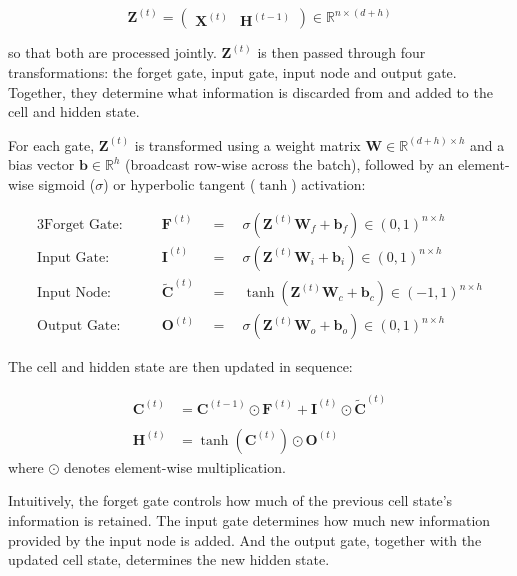 \documentclass[
]{krantz}
\begin{document}
\[
\mathbf{Z}^{(t)} = 
\begin{pmatrix}
\mathbf{X}^{(t)} & \mathbf{H}^{(t-1)}
\end{pmatrix} \in \mathbb{R}^{n \times (d + h)}
\]

so that both are processed jointly. \(\mathbf{Z}^{(t)}\) is then passed through four transformations: the forget gate, input gate, input node and output gate. Together, they determine what information is discarded from and added to the cell and hidden state.

For each gate, \(\mathbf{Z}^{(t)}\) is transformed using a weight matrix \(\mathbf{W} \in \mathbb{R}^{(d + h) \times h}\) and a bias vector \(\mathbf{b} \in \mathbb{R}^h\) (broadcast row-wise across the batch), followed by an element-wise sigmoid (\(\sigma\)) or hyperbolic tangent (\(\tanh\)) activation:

\begin{alignat*}{3}
\text{Forget Gate:} \qquad & \mathbf{F}^{(t)} & \enspace = \enspace &
  \sigma \left(\mathbf{Z}^{(t)} \mathbf{W}_f + \mathbf{b}_f\right) \in (0, 1)^{n \times h} \\
\text{Input Gate:} \qquad & \mathbf{I}^{(t)}& \enspace = \enspace &
  \sigma \left(\mathbf{Z}^{(t)} \mathbf{W}_i + \mathbf{b}_i\right) \in (0, 1)^{n \times h} \\
\text{Input Node:} \qquad & \tilde{\mathbf{C}}^{(t)} & \enspace = \enspace &
  \tanh \left(\mathbf{Z}^{(t)} \mathbf{W}_c + \mathbf{b}_c\right) \in (-1, 1)^{n \times h} \\
\text{Output Gate:} \qquad & \mathbf{O}^{(t)} & \enspace = \enspace & 
  \sigma \left(\mathbf{Z}^{(t)} \mathbf{W}_o + \mathbf{b}_o\right) \in (0, 1)^{n \times h}
\end{alignat*}

The cell and hidden state are then updated in sequence:

\begin{align*}
  \mathbf{C}^{(t)} &= \mathbf{C}^{(t-1)} \odot \mathbf{F}^{(t)} + \mathbf{I}^{(t)} \odot \tilde{\mathbf{C}}^{(t)} \\
  \\
  \mathbf{H}^{(t)} &= \tanh\left(\mathbf{C}^{(t)}\right) \odot \mathbf{O}^{(t)}
\end{align*}
where \(\odot\) denotes element-wise multiplication.

Intuitively, the forget gate controls how much of the previous cell state's information is retained. The input gate determines how much new information provided by the input node is added. And the output gate, together with the updated cell state, determines the new hidden state.
\end{document}
